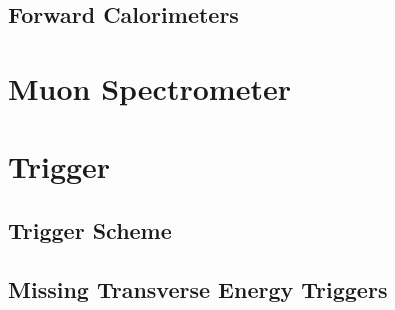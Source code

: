 \subsection{Forward Calorimeters}


\section{Muon Spectrometer}


\section{Trigger}
\label{sec:trigger}

\subsection{Trigger Scheme}

\subsection{Missing Transverse Energy Triggers}

